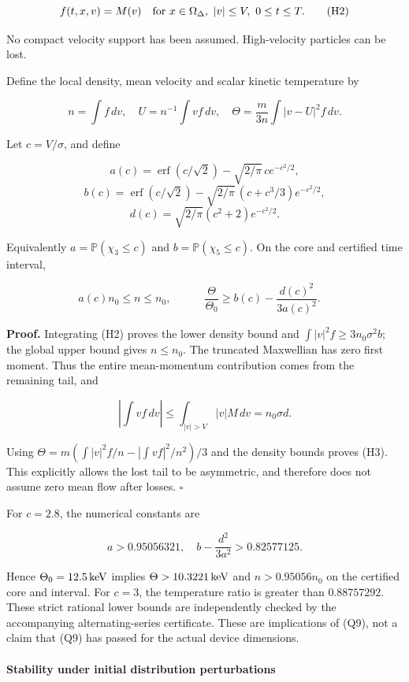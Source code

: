 \[
f(t,x,v)=M(v)
\quad\hbox{for }x\in\Omega_\Delta,\ |v|\le V,\ 0\le t\le T.
\tag{H2}
\]

No compact velocity support has been assumed. High-velocity particles
can be lost.

Define the local density, mean velocity and scalar kinetic temperature
by

\[
n=\int f\,dv,\quad U=n^{-1}\int vf\,dv,\quad
\Theta=\frac{m}{3n}\int |v-U|^2f\,dv.
\]

Let \(c=V/\sigma\), and define

\[
a(c)=\operatorname{erf}(c/\sqrt2)
       -\sqrt{2/\pi}\,c e^{-c^2/2},
\] \[
b(c)=\operatorname{erf}(c/\sqrt2)
       -\sqrt{2/\pi}\,(c+c^3/3)e^{-c^2/2},
\] \[
d(c)=\sqrt{2/\pi}(c^2+2)e^{-c^2/2}.
\]

Equivalently \(a=\mathbb P(\chi_3\le c)\) and
\(b=\mathbb P(\chi_5\le c)\). On the core and certified time interval,

\[
a(c)n_0\le n\le n_0,\qquad
\boxed{\quad
\frac{\Theta}{\Theta_0}
\ge b(c)-\frac{d(c)^2}{3a(c)^2}.
\quad}
\tag{H3}
\]

\textbf{Proof.} Integrating (H2) proves the lower density bound and
\(\int |v|^2f\ge3n_0\sigma^2b\); the global upper bound gives
\(n\le n_0\). The truncated Maxwellian has zero first moment. Thus the
entire mean-momentum contribution comes from the remaining tail, and

\[
\left|\int vf\,dv\right|
\le\int_{|v|>V}|v|M\,dv=n_0\sigma d.
\]

Using \(\Theta=m(\int |v|^2f/n-|\int vf|^2/n^2)/3\) and the density
bounds proves (H3). This explicitly allows the lost tail to be
asymmetric, and therefore does not assume zero mean flow after losses.
\(\square\)

For \(c=2.8\), the numerical constants are

\[
a>0.95056321,\quad
b-\frac{d^2}{3a^2}>0.82577125.
\]

Hence \(\Theta_0=12.5\,{\rm keV}\) implies \(\Theta>10.3221\,{\rm keV}\)
and \(n>0.95056n_0\) on the certified core and interval. For \(c=3\),
the temperature ratio is greater than \(0.88757292\). These strict
rational lower bounds are independently checked by the accompanying
alternating-series certificate. These are
implications of (Q9), not a claim that (Q9) has passed for the actual
device dimensions.

\paragraph{Stability under initial distribution
perturbations}\label{stability-under-initial-distribution-perturbations}

